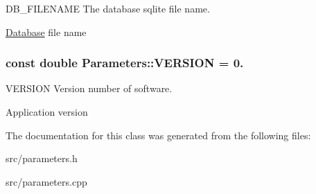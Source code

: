 D\+B\+\_\+\+F\+I\+L\+E\+N\+A\+M\+E The database sqlite file name. 

\hyperlink{classDatabase}{Database} file name \hypertarget{classParameters_a279ee24140c761de46178daa8960bdc8}{
\subsubsection[{V\+E\+R\+S\+I\+O\+N}]{\setlength{\rightskip}{0pt plus 5cm}const double Parameters\+::\+V\+E\+R\+S\+I\+O\+N = 0.\hspace{0.3cm}{\ttfamily [static]}}}\label{classParameters_a279ee24140c761de46178daa8960bdc8}


V\+E\+R\+S\+I\+O\+N Version number of software. 

Application version 

The documentation for this class was generated from the following files\+:\begin{DoxyCompactItemize}
\item 
src/parameters.\+h\item 
src/parameters.\+cpp\end{DoxyCompactItemize}
